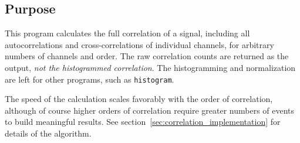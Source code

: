 \documentclass{article}
\begin{document}
\subsection{Purpose}
This program calculates the full correlation of a signal, including all autocorrelations and cross-correlations of individual channels, for arbitrary numbers of channels and order. The raw correlation counts are returned as the output, \textit{not the histogrammed correlation}. The histogramming and normalization are left for other programs, such as \texttt{histogram}.

The speed of the calculation scales favorably with the order of correlation, although of course higher orders of correlation require greater numbers of events to build meaningful results. See section~\ref{sec:correlation_implementation} for details of the algorithm.
\end{document}
